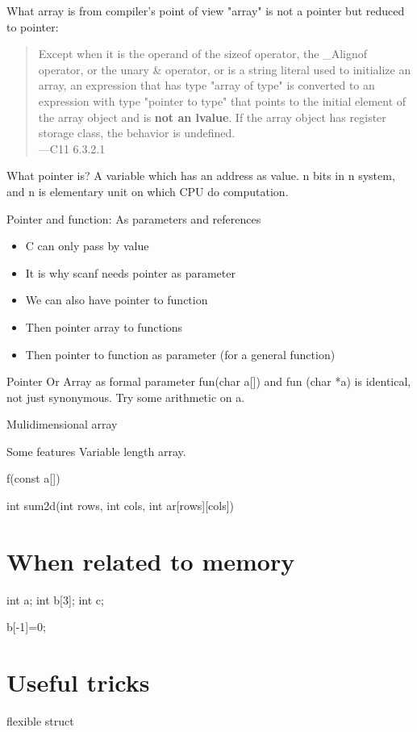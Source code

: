 \documentclass{beamer}
\begin{document}
\begin{frame}{What array is from compiler's point of view}
  "array" is not a pointer but reduced to pointer:
  \begin{quote}
    Except when it is the operand of the sizeof operator, the \_Alignof operator, or the unary \& operator, or is a string literal used to initialize an array, an expression that has type "array of type" is converted to an expression with type "pointer to type" that points to the initial element of the array object and is \textbf{not an lvalue}. If the array object has register storage class, the behavior is undefined.
    \\     ---C11 6.3.2.1
  \end{quote}
\end{frame}

\begin{frame}{What pointer is?}
A variable which has an address as value. n bits in n system, and n is elementary unit on which CPU do computation.

\end{frame}

\begin{frame}{Pointer and function: As parameters and references}
  \begin{itemize}
    \item <1-> C can only pass by value
    \item <2-> It is why scanf needs pointer as parameter
    \item <3-> We can also have pointer to function 
    \item <4-> Then pointer array to functions
    \item <5-> Then pointer to function as parameter (for a general function)
  \end{itemize}
\end{frame}

\begin{frame}{Pointer Or Array as formal parameter}
fun(char a[]) and fun (char *a) is identical, not just synonymous.
Try some arithmetic on a.
\end{frame}

\begin{frame}{Mulidimensional array}

\end{frame}

\begin{frame}{Some features}
  Variable length array.
  
  f(const a[])

  int sum2d(int rows, int cols, int ar[rows][cols])

\end{frame}

\section{When related to memory}

int a;
int b[3];
int c; 

b[-1]=0;

\section{Useful tricks}

flexible struct
\end{document}
